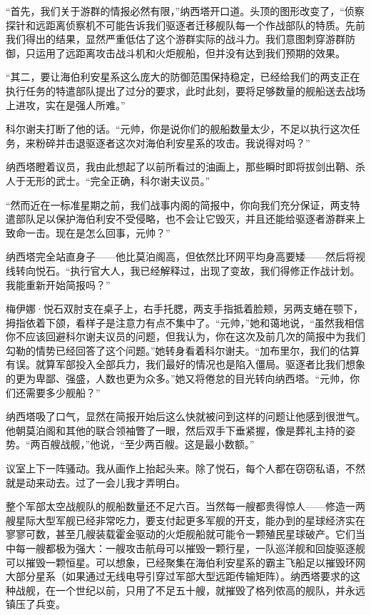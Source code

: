 \documentclass[AutoFakeBold=true]{book}
\begin{document}
``首先，我们关于游群的情报必然有限，''纳西塔开口道。头顶的图形改变了，``侦察探针和远距离侦察机不可能告诉我们驱逐者迁移舰队每一个作战部队的特质。先前我们得出的结果，显然严重低估了这个游群实际的战斗力。我们意图刺穿游群防御，只运用了远距离攻击战斗机和火炬舰船，但并没有达到我们预期的效果。

``其二，要让海伯利安星系这么庞大的防御范围保持稳定，已经给我们的两支正在执行任务的特遣部队提出了过分的要求，此时此刻，要将足够数量的舰船送去战场上进攻，实在是强人所难。''

科尔谢夫打断了他的话。``元帅，你是说你们的舰船数量太少，不足以执行这次任务，来粉碎并击退驱逐者这次对海伯利安星系的攻击。我说得对吗？''

纳西塔瞪着议员，我由此想起了以前所看过的油画上，那些瞬时即将拔剑出鞘、杀人于无形的武士。``完全正确，科尔谢夫议员。''

``然而近在一标准星期之前，我们战事内阁的简报中，你向我们充分保证，两支特遣部队足以保护海伯利安不受侵略，也不会让它毁灭，并且还能给驱逐者游群来上致命一击。现在是怎么回事，元帅？''

纳西塔完全站直身子——他比莫泊阁高，但依然比环网平均身高要矮——然后将视线转向悦石。``执行官大人，我已经解释过，出现了变故，我们得修正作战计划。我能重新开始简报吗？''

梅伊娜·悦石双肘支在桌子上，右手托腮，两支手指抵着脸颊，另两支蜷在颚下，拇指依着下颌，看样子是注意力有点不集中了。``元帅，''她和蔼地说，``虽然我相信你不应该回避科尔谢夫议员的问题，但我认为，你在这次及前几次的简报中为我们勾勒的情势已经回答了这个问题。''她转身看着科尔谢夫。``加布里尔，我们的估算有误。就算军部投入全部兵力，我们最好的情况也是陷入僵局。驱逐者比我们想象的更为卑鄙、强盛，人数也更为众多。''她又将倦怠的目光转向纳西塔。``元帅，你们还需要多少舰船？''

纳西塔吸了口气，显然在简报开始后这么快就被问到这样的问题让他感到很泄气。他朝莫泊阁和其他的联合领袖瞥了一眼，然后双手下垂紧握，像是葬礼主持的姿势。``两百艘战舰，''他说，``{\kaishu 至少}两百艘。这是最小数额。''

议室上下一阵骚动。我从画作上抬起头来。除了悦石，每个人都在窃窃私语，不然就是动来动去。过了一会儿我才弄明白。

整个军部太空战舰队的舰船数量还不足六百。当然每一艘都贵得惊人——修造一两艘星际大型军舰已经非常吃力，要支付起更多军舰的开支，能办到的星球经济实在寥寥可数，甚至几艘装载霍金驱动的火炬舰船就可能令一颗殖民星球破产。它们当中每一艘都极为强大：一艘攻击航母可以摧毁一颗行星，一队巡洋舰和回旋驱逐舰可以摧毁一颗恒星。可以想象，已经聚集在海伯利安星系的霸主飞船足以摧毁环网大部分星系（如果通过无线电导引穿过军部大型远距传输矩阵）。纳西塔要求的这种战舰，在一个世纪以前，只用了不足五十艘，就摧毁了格列侬高的舰队，并永远镇压了兵变。
\end{document}
